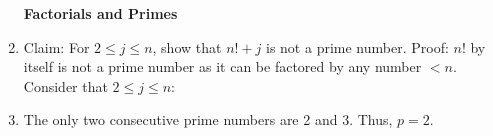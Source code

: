 \documentclass{amsart}
\begin{document}
\begin{enumerate}
\centerline{\textbf{Factorials and Primes}}
  \item
  \begin{flushleft}
  Claim: For $2\leq j\leq n$, show that $n!+j$ is not a prime number.
  Proof: $n!$ by itself is not a prime number as it can be factored by any number $< n$. Consider that $2\leq j\leq n:$
  \end{flushleft}

  \item
  \begin{flushleft}
  The only two consecutive prime numbers are 2 and 3. Thus, $p = 2$.
  \end{flushleft}
\end{enumerate}
\end{document}
